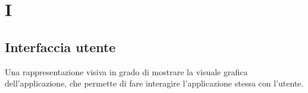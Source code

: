 \section{I}

\subsection{Interfaccia utente} Una rappresentazione visiva in grado di mostrare la visuale grafica dell’applicazione, che permette di fare interagire l’applicazione stessa con l’utente.

\clearpage